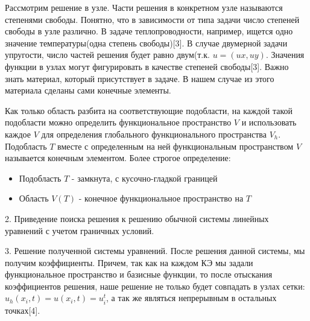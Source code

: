 Рассмотрим решение в узле. Части решения в конкретном узле называются степенями свободы.
Понятно, что в зависимости от типа задачи число степеней свободы
в узле различно. В задаче теплопроводности, например, ищется одно значение температуры(одна степень свободы)[3].
В случае двумерной задачи упругости, число частей решения будет равно двум(т.к. $u=(ux, uy)$.
    Значения функции в узлах могут фигурировать в качестве степеней свободы[3].
Важно знать материал, который присутствует в задаче. В нашем случае из этого материала 
сделаны сами конечные элементы.

Как только область разбита на соответствующие подобласти, на каждой такой подобласти можно 
определить функциональное пространство $V$ и использовать каждое $V$ для определения глобального
функционального пространства $V_h$. Подобласть $T$ вместе с определенным на ней функциональным пространством $V$ называется конечным элементом. Более строгое определение:

\begin{itemize}
    \item Подобласть $T$ - замкнута, с кусочно-гладкой границей
    \item Область $V(T)$ - конечное функциональное пространство на $T$
\end{itemize}

2. Приведение поиска решения к решению обычной системы линейных уравнений с учетом граничных условий.

3. Решение полученной системы уравнений.
После решения данной системы, мы получим коэффициенты. Причем, так как на каждом КЭ 
мы задали функциональное пространство и базисные функции, то после отыскания
коэффициентов решения, наше решение не только будет совпадать в узлах сетки: $u_h(x_i, t) = u(x_i, t) = u_i^t$,
а так же являться непрерывным в остальных точках[4].
